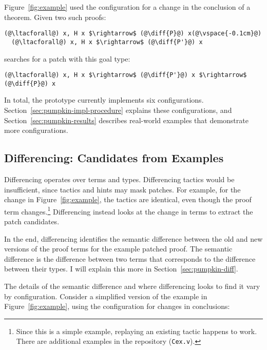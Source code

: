 Figure~\ref{fig:example} used the configuration for a change in the conclusion of a theorem.
Given two such proofs:

\begin{lstlisting}[language=coq]
  (@\ltacforall@) x, H x $\rightarrow$ (@\diff{P}@) x(@\vspace{-0.1cm}@)
  (@\ltacforall@) x, H x $\rightarrow$ (@\diff{P'}@) x
\end{lstlisting}
\sysname searches for a patch with this goal type:

\begin{lstlisting}[language=coq]
  (@\ltacforall@) x, H x $\rightarrow$ (@\diff{P'}@) x $\rightarrow$ (@\diff{P}@) x
\end{lstlisting}

In total, the \sysname prototype currently implements six configurations.
Section~\ref{sec:pumpkin-impl-procedure} explains these configurations,
and Section~\ref{sec:pumpkin-results} describes real-world examples that demonstrate more configurations.

\subsection{Differencing: Candidates from Examples}
\label{sec:pumpkin-spec-diff}

Differencing operates over terms and types. Differencing tactics
would be insufficient, since tactics and hints may mask patches.
For example, for the change in Figure~\ref{fig:example},
the tactics are identical, even though the proof term changes.\footnote{Since this is a simple example, replaying an existing tactic happens to work. There
are additional examples in the repository (\lstinline{Cex.v}).} %
Differencing instead looks at the change in terms to extract the patch candidates.

In the end, differencing identifies the semantic difference between the old and new versions of the proof terms for the example patched proof.
The semantic difference is the difference between two terms that corresponds to the difference between their types.
I will explain this more in Section~\ref{sec:pumpkin-diff}.

The details of the semantic difference and where differencing looks to find it vary by configuration.
Consider a simplified version of the example in Figure~\ref{fig:example}, using the configuration for changes in conclusions:

